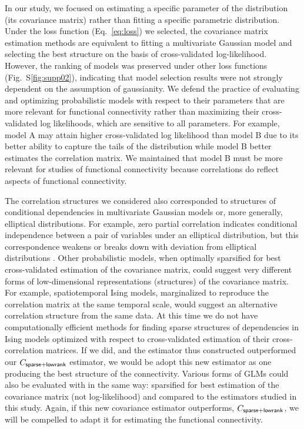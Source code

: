\documentclass[10pt]{article}
\begin{document}
In our study, we focused on estimating a specific parameter of the distribution (its covariance matrix) rather than fitting a specific parametric distribution.  Under the loss function (Eq.~\ref{eq:loss}) we selected, the covariance matrix estimation methods are equivalent to fitting a multivariate Gaussian model and selecting the best structure on the basis of cross-validated log-likelihood. However, the ranking of models was preserved under other loss functions (Fig.~S\ref{fig:supp02}), indicating that model selection results were not strongly dependent on the assumption of gaussianity. We defend the practice of evaluating and optimizing probabilistic models with respect to their parameters that are more relevant for functional connectivity rather than maximizing their cross-validated log likelihoods, which are sensitive to all parameters. For example, model A may attain higher cross-validated log likelihood than model B due to its better ability to capture the tails of the distribution while model B better estimates the correlation matrix. We maintained that model B must be more relevant for studies of functional connectivity because correlations do reflect aspects of functional connectivity.

The correlation structures we considered also corresponded to structures of conditional dependencies in multivariate Gaussian models or, more generally, elliptical distributions. For example, zero partial correlation indicates conditional independence between a pair of variables under an elliptical distribution, but this correspondence weakens or breaks down with deviation from elliptical distributions \cite{Loh:2012}.  Other probabilistic models, when optimally sparsified for best cross-validated estimation of the covariance matrix, could suggest very different forms of low-dimensional representations (structures) of the covariance matrix. For example, spatiotemporal Ising models, marginalized to reproduce the correlation matrix at the same temporal scale, would suggest an alternative correlation structure from the same data. At this time we do not have computationally efficient methods for finding sparse structures of dependencies in Ising models optimized with respect to cross-validated estimation of their cross-correlation matrices. If we did, and the estimator thus constructed outperformed our $C_{\sf sparse+lowrank}$ estimator, we would be adopt this new estimator as one producing the best structure of the connectivity. Various forms of GLMs could also be evaluated with in the same way: sparsified for best estimation of the covariance matrix (not log-likelihood) and compared to the estimators studied in this study.  Again, if this new covariance estimator outperforms, $C_{\sf sparse+lowrank}$, we will be compelled to adapt it for estimating the functional connectivity.
\end{document}
